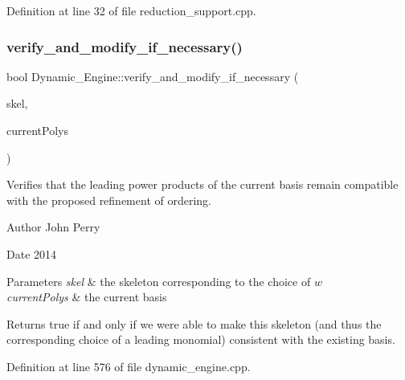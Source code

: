 Definition at line 32 of file reduction\+\_\+support.\+cpp.

\mbox{\label{group___g_b_computation_gaf3c21c23093fae5467dd770f790540f6}} 
\subsubsection{\texorpdfstring{verify\+\_\+and\+\_\+modify\+\_\+if\+\_\+necessary()}{verify\_and\_modify\_if\_necessary()}}
{\footnotesize\ttfamily bool Dynamic\+\_\+\+Engine\+::verify\+\_\+and\+\_\+modify\+\_\+if\+\_\+necessary (\begin{DoxyParamCaption}\item[{\hyperlink{group___c_l_s_solvers_class_l_p___solvers_1_1_l_p___solver}{L\+P\+\_\+\+Solver} $\ast$}]{skel,  }\item[{const list$<$ \hyperlink{group__polygroup_class_abstract___polynomial}{Abstract\+\_\+\+Polynomial} $\ast$ $>$ \&}]{current\+Polys }\end{DoxyParamCaption})}



Verifies that the leading power products of the current basis remain compatible with the proposed refinement of ordering. 

\begin{DoxyAuthor}{Author}
John Perry 
\end{DoxyAuthor}
\begin{DoxyDate}{Date}
2014 
\end{DoxyDate}

\begin{DoxyParams}{Parameters}
{\em skel} & the skeleton corresponding to the choice of $w$ \\
\hline
{\em current\+Polys} & the current basis \\
\hline
\end{DoxyParams}
\begin{DoxyReturn}{Returns}
{\ttfamily true} if and only if we were able to make this skeleton (and thus the corresponding choice of a leading monomial) consistent with the existing basis. 
\end{DoxyReturn}


Definition at line 576 of file dynamic\+\_\+engine.\+cpp.

